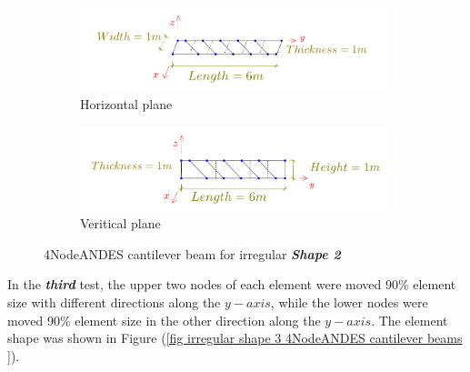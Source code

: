 \documentclass[fleqn,11pt,letter]{article}
\begin{document}
\begin{figure}[H]
  \centering
    \begin{subfigure}{0.5\textwidth}
      \centering
      \includegraphics[width=9cm]{../Figure_files/4NodeANDES/beam_ANDES_xy_bending_pureshape2.pdf}
      \caption{Horizontal plane}
    \end{subfigure}
    \begin{subfigure}{0.5\textwidth}
      \centering
      \includegraphics[width=9cm]{../Figure_files/4NodeANDES/beam_ANDES_yz_inPlane_pureshape2.pdf}
      \caption{Veritical  plane}
    \end{subfigure}
  \caption{4NodeANDES cantilever beam for irregular \textbf{\emph{Shape 2}} }
  \label{fig irregular shape 2 4NodeANDES cantilever beams }
\end{figure}





In the \emph{\textbf{third}} test, the upper two nodes of each element were moved 90\% element size with different directions along the $y-axis$, while the lower nodes  were moved 90\% element size in the other direction along the $y-axis$. The element shape was shown in Figure (\ref{fig irregular shape 3 4NodeANDES cantilever beams }).
\end{document}
